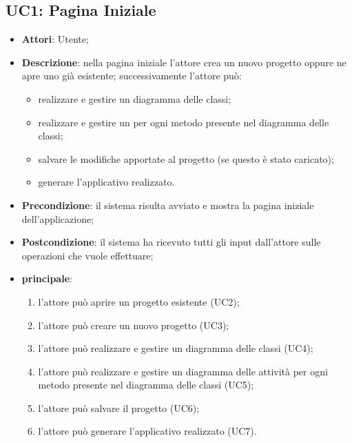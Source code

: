 \subsection{UC1: Pagina Iniziale}
\label{UC1}
\begin{itemize}
	\item \textbf{Attori}: Utente;
	\item \textbf{Descrizione}: nella pagina iniziale l'attore crea un nuovo progetto oppure ne apre uno già esistente; successivamente l'attore può:
	\begin{itemize}
		\item realizzare e gestire un diagramma delle classi;
		\item realizzare e gestire un  per ogni metodo presente nel diagramma delle classi;
		\item salvare le modifiche apportate al progetto (se questo è stato caricato);
		\item generare l'applicativo realizzato.
	\end{itemize}
	\item \textbf{Precondizione}: il sistema risulta avviato e mostra la pagina iniziale dell'applicazione;
	\item \textbf{Postcondizione}: il sistema ha ricevuto tutti gli input dall'attore sulle operazioni che vuole effettuare;
	\item \textbf{ principale}:
	\begin{enumerate}
		\item l'attore può aprire un progetto esistente (UC2);
		\item l'attore può creare un nuovo progetto (UC3);
		\item l'attore può realizzare e gestire un diagramma delle classi (UC4);
		\item l'attore può realizzare e gestire un diagramma delle attività per ogni metodo presente nel diagramma delle classi (UC5);
		\item l'attore può salvare il progetto (UC6);
		\item l'attore può generare l'applicativo realizzato (UC7).
	\end{enumerate}
\end{itemize}

